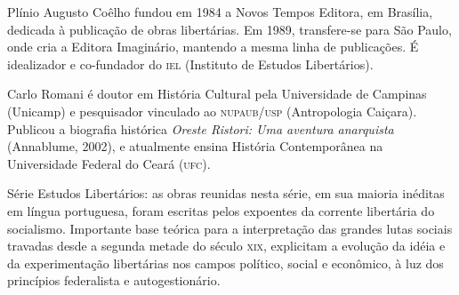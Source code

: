 \begin{resumopage}
\item[Plínio Augusto Coêlho]  fundou em 1984 a Novos Tempos Editora, em
Brasília, dedicada à publicação de obras libertárias. Em 1989, transfere-se para
São Paulo, onde cria a Editora Imaginário, mantendo a mesma linha de
publicações. É idealizador e co-fundador do \textsc{iel} (Instituto de Estudos
Libertários).  

\item[Carlo Romani] é doutor em História Cultural pela Universidade de Campinas
(Unicamp) e pesquisador vinculado ao \textsc{nupaub/usp} (Antropologia Caiçara).
Publicou a biografia histórica \textit{Oreste Ristori: Uma aventura anarquista}
(Annablume, 2002), e atualmente ensina História Contemporânea na Universidade
Federal do Ceará (\textsc{ufc}).  

\item[Série Estudos Libertários:] as obras reunidas nesta série, em sua maioria
inéditas em língua portuguesa, foram escritas pelos expoentes da corrente
libertária do socialismo.  Importante base teórica para a interpretação das
grandes lutas sociais travadas desde a segunda metade do século \textsc{xix},
explicitam a evolução da idéia e da experimentação libertárias nos campos
político, social e econômico, à luz dos princípios federalista e
autogestionário.          

\end{resumopage}
